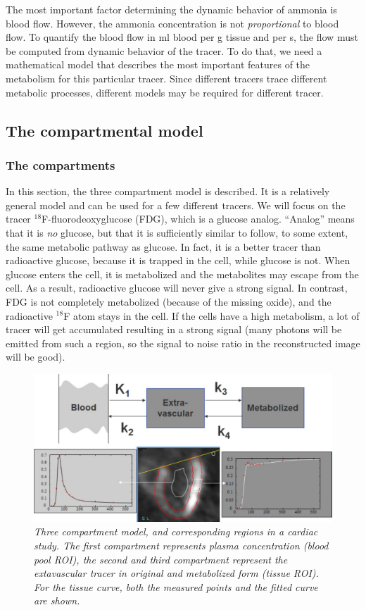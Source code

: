 The most important factor determining the dynamic behavior of ammonia
is blood flow. However, the ammonia concentration is not {\em
proportional} to blood flow. To quantify the blood flow in ml blood
per g tissue and per s, the flow must be computed from dynamic
behavior of the tracer. To do that, we need a mathematical model that
describes the most important features of the metabolism for this
particular tracer. Since different tracers trace different metabolic
processes, different models may be required for different tracer.

\subsection{The compartmental model}
\subsubsection{The compartments}
In this section, the three compartment model is described. It is a
relatively general model and can be used for a few different
tracers. We will focus on the tracer $^{18}$F-fluorodeoxyglucose
(FDG), which is a glucose analog.  ``Analog'' means that it is {\em
no} glucose, but that it is sufficiently similar to follow, to some
extent, the same metabolic pathway as glucose. In fact, it is a better
tracer than radioactive glucose, because it is trapped in the cell,
while glucose is not. When glucose enters the cell, it is metabolized
and the metabolites may escape from the cell. As a result, radioactive
glucose will never give a strong signal. In contrast, FDG is not
completely metabolized (because of the missing oxide), and the
radioactive $^{18}$F atom stays in the cell. If the cells have a high
metabolism, a lot of tracer will get accumulated resulting in a strong
signal (many photons will be emitted from such a region, so the signal
to noise ratio in the reconstructed image will be good).

\begin{figure}[tb]
\centering
\includegraphics[width=\figbig]{figs/fig_kinemodel.pdf}
\caption{\label{fig:kinemodel} \emph{Three compartment model, and
corresponding regions in a cardiac study. The first compartment represents
plasma concentration (blood pool ROI), the second and third compartment
represent the extavascular tracer in original and metabolized form (tissue
ROI). For the tissue curve, both the measured points and the fitted curve are
shown.}}
\end{figure}

